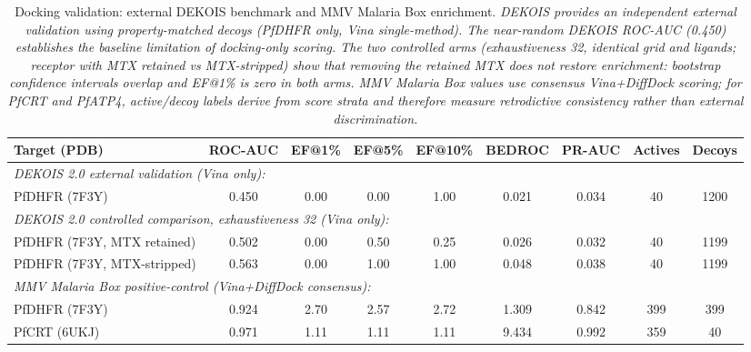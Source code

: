 
\begin{table}[!htbp]
\centering
\caption{Docking validation: external DEKOIS benchmark and MMV Malaria Box enrichment. \textit{DEKOIS provides an independent external validation using property-matched decoys (PfDHFR only, Vina single-method). The near-random DEKOIS ROC-AUC (\num{0.450}) establishes the baseline limitation of docking-only scoring. The two controlled arms (exhaustiveness \num{32}, identical grid and ligands; receptor with MTX retained vs MTX-stripped) show that removing the retained MTX does not restore enrichment: bootstrap confidence intervals overlap and EF@1\% is zero in both arms. MMV Malaria Box values use consensus Vina+DiffDock scoring; for PfCRT and PfATP4, active/decoy labels derive from score strata and therefore measure retrodictive consistency rather than external discrimination.}}
\label{tab:sm_enrichment_validation}
\scriptsize
\begin{tabular}{lcccccccc}
\toprule
\textbf{Target (PDB)} & \textbf{ROC-AUC} & \textbf{EF@1\%} & \textbf{EF@5\%} & \textbf{EF@10\%} & \textbf{BEDROC} & \textbf{PR-AUC} & \textbf{Actives} & \textbf{Decoys} \\
\midrule
\multicolumn{9}{l}{\textit{DEKOIS 2.0 external validation (Vina only):}} \\
PfDHFR (7F3Y) & \num{0.450} & \num{0.00} & \num{0.00} & \num{1.00} & \num{0.021} & \num{0.034} & \num{40} & \num{1200} \\
\multicolumn{9}{l}{\textit{DEKOIS 2.0 controlled comparison, exhaustiveness \num{32} (Vina only):}} \\
PfDHFR (7F3Y, MTX retained) & \num{0.502} & \num{0.00} & \num{0.50} & \num{0.25} & \num{0.026} & \num{0.032} & \num{40} & \num{1199} \\
PfDHFR (7F3Y, MTX-stripped) & \num{0.563} & \num{0.00} & \num{1.00} & \num{1.00} & \num{0.048} & \num{0.038} & \num{40} & \num{1199} \\
\midrule
\multicolumn{9}{l}{\textit{MMV Malaria Box positive-control (Vina+DiffDock consensus):}} \\
PfDHFR (7F3Y) & \num{0.924} & \num{2.70} & \num{2.57} & \num{2.72} & \num{1.309} & \num{0.842} & \num{399} & \num{399} \\
PfCRT (6UKJ) & \num{0.971} & \num{1.11} & \num{1.11} & \num{1.11} & \num{9.434} & \num{0.992} & \num{359} & \num{40} \\

\end{tabular}
\end{table}
